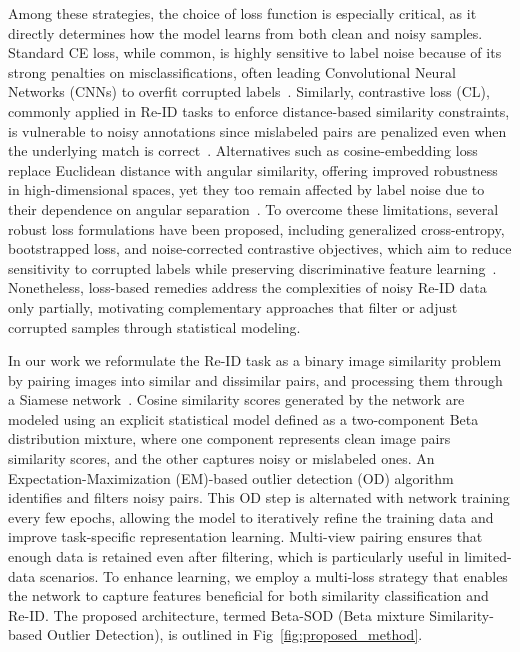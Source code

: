 \documentclass[lettersize,journal]{IEEEtran}
\begin{document}
Among these strategies, the choice of loss function is especially critical, as it directly determines how the model learns from both clean and noisy samples. Standard CE loss, while common, is highly sensitive to label noise because of its strong penalties on misclassifications, often leading Convolutional Neural Networks (CNNs) to overfit corrupted labels~\cite{10,11}. Similarly, contrastive loss (CL), commonly applied in Re-ID tasks to enforce distance-based similarity constraints, is vulnerable to noisy annotations since mislabeled pairs are penalized even when the underlying match is correct~\cite{12,13}. Alternatives such as cosine-embedding loss replace Euclidean distance with angular similarity, offering improved robustness in high-dimensional spaces, yet they too remain affected by label noise due to their dependence on angular separation~\cite{14,15}. To overcome these limitations, several robust loss formulations have been proposed, including generalized cross-entropy, bootstrapped loss, and noise-corrected contrastive objectives, which aim to reduce sensitivity to corrupted labels while preserving discriminative feature learning~\cite{16,17,18}. Nonetheless, loss-based remedies address the complexities of noisy Re-ID data only partially, motivating complementary approaches that filter or adjust corrupted samples through statistical modeling.

In our work we reformulate the Re-ID task as a binary image similarity problem by pairing images into similar and dissimilar pairs, and processing them through a Siamese network~\cite{melekhov2016siamese}. Cosine similarity scores generated by the network are modeled using an explicit statistical model defined as a two-component Beta distribution mixture, where one component represents clean image pairs similarity scores, and the other captures noisy or mislabeled ones. An Expectation-Maximization (EM)-based outlier detection (OD) algorithm identifies and filters noisy pairs. This OD step is alternated with network training every few epochs, allowing the model to iteratively refine the training data and improve task-specific representation learning. Multi-view pairing ensures that enough data is retained even after filtering, which is particularly useful in limited-data scenarios. To enhance learning, we employ a multi-loss strategy that enables the network to capture features beneficial for both similarity classification and Re-ID. The proposed architecture, termed Beta-SOD (Beta mixture Similarity-based Outlier Detection), is outlined in Fig~\ref{fig:proposed_method}.
\end{document}
